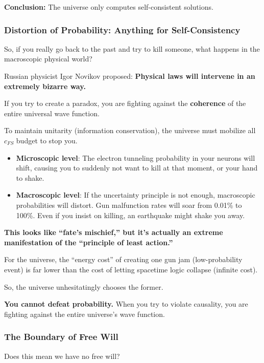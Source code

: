 \textbf{Conclusion:} The universe only computes self-consistent solutions.

\subsubsection{Distortion of Probability: Anything for Self-Consistency}

So, if you really go back to the past and try to kill someone, what happens in the macroscopic physical world?

Russian physicist Igor Novikov proposed: \textbf{Physical laws will intervene in an extremely bizarre way.}

If you try to create a paradox, you are fighting against the \textbf{coherence} of the entire universal wave function.

To maintain unitarity (information conservation), the universe must mobilize all $c_{FS}$ budget to stop you.

\begin{itemize}
\item \textbf{Microscopic level}: The electron tunneling probability in your neurons will shift, causing you to suddenly not want to kill at that moment, or your hand to shake.

\item \textbf{Macroscopic level}: If the uncertainty principle is not enough, macroscopic probabilities will distort. Gun malfunction rates will soar from 0.01\% to 100\%. Even if you insist on killing, an earthquake might shake you away.
\end{itemize}

\textbf{This looks like ``fate's mischief,'' but it's actually an extreme manifestation of the ``principle of least action.''}

For the universe, the ``energy cost'' of creating one gun jam (low-probability event) is far lower than the cost of letting spacetime logic collapse (infinite cost).

So, the universe unhesitatingly chooses the former.

\textbf{You cannot defeat probability.} When you try to violate causality, you are fighting against the entire universe's wave function.

\subsubsection{The Boundary of Free Will}

Does this mean we have no free will?

